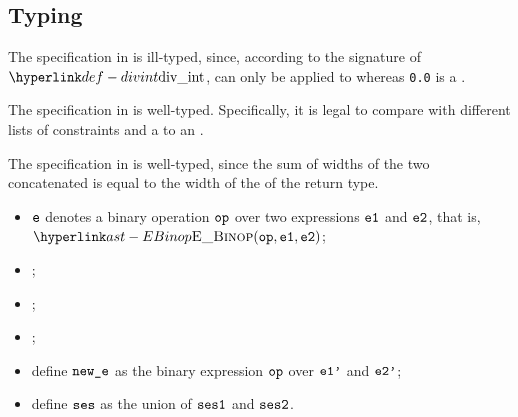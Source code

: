 \begin{mathpar}
\end{mathpar}

\subsection{Typing}
The specification in  is ill-typed, since,
according to the signature of $\divint$, \Tdiv{} can only be applied to \integertypesterm{}
whereas \verb|0.0| is a \realtypeterm.

The specification in  is well-typed.
Specifically, it is legal to compare \wellconstrainedintegertypes{}
with different lists of constraints and a \wellconstrainedintegertype{} to an \unconstrainedintegertype{}.

The specification in  is well-typed, since
the sum of widths of the two concatenated \bitvectortypesterm{}
is equal to the width of the \bitvectortypeterm{} of the return type.

\ProseParagraph
\AllApply
\begin{itemize}
  \item $\ve$ denotes a binary operation $\op$ over two expressions $\veone$ and $\vetwo$, that is, \\ $\EBinop(\op, \veone, \vetwo)$;
  \item \Proseannotateexpr{$\tenv$}{$\veone$}{\\ $(\vtone, \veonep, \vsesone)$\ProseOrTypeError};
  \item \Proseannotateexpr{$\tenv$}{$\vetwo$}{\\ $(\vttwo, \vetwop, \vsestwo)$\ProseOrTypeError};
  \item \Proseapplybinoptypes{$\tenv$}{\op}{\vtone}{\vttwo}{$\vt$\ProseOrTypeError};
  \item define $\newe$ as the binary expression $\op$ over $\veonep$ and $\vetwop$;
  \item define $\vses$ as the union of $\vsesone$ and $\vsestwo$.
\end{itemize}

